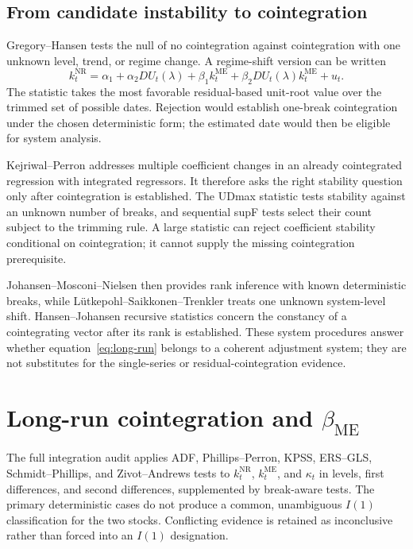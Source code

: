 \documentclass[11pt,a4paper]{article}
\begin{document}
\subsection{From candidate instability to cointegration}

Gregory--Hansen tests the null of no cointegration against cointegration with
one unknown level, trend, or regime change. A regime-shift version can be
written
\begin{equation}
 k_t^{\mathrm{NR}}=\alpha_1+\alpha_2DU_t(\lambda)
 +\beta_1 k_t^{\mathrm{ME}}
 +\beta_2DU_t(\lambda)k_t^{\mathrm{ME}}+u_t .
 \label{eq:gh}
\end{equation}
The statistic takes the most favorable residual-based unit-root value over
the trimmed set of possible dates. Rejection would establish one-break
cointegration under the chosen deterministic form; the estimated date would
then be eligible for system analysis.

Kejriwal--Perron addresses multiple coefficient changes in an already
cointegrated regression with integrated regressors. It therefore asks the
right stability question only after cointegration is established. The
UDmax statistic tests stability against an unknown number of breaks, and
sequential supF tests select their count subject to the trimming rule. A
large statistic can reject coefficient stability conditional on
cointegration; it cannot supply the missing cointegration prerequisite.

Johansen--Mosconi--Nielsen then provides rank inference with known
deterministic breaks, while L\"utkepohl--Saikkonen--Trenkler treats one
unknown system-level shift. Hansen--Johansen recursive statistics concern
the constancy of a cointegrating vector after its rank is established.
These system procedures answer whether equation~\eqref{eq:long-run} belongs
to a coherent adjustment system; they are not substitutes for the
single-series or residual-cointegration evidence.

\FloatBarrier
\section{Long-run cointegration and
\texorpdfstring{\(\beta_{\mathrm{ME}}\)}{beta ME}}

The full integration audit applies ADF, Phillips--Perron, KPSS, ERS--GLS,
Schmidt--Phillips, and Zivot--Andrews tests to
\(k_t^{\mathrm{NR}}\), \(k_t^{\mathrm{ME}}\), and \(\kappa_t\) in levels,
first differences, and second differences, supplemented by break-aware
tests. The primary deterministic cases do not produce a common, unambiguous
\(I(1)\) classification for the two stocks. Conflicting evidence is retained
as inconclusive rather than forced into an \(I(1)\) designation.
\end{document}
